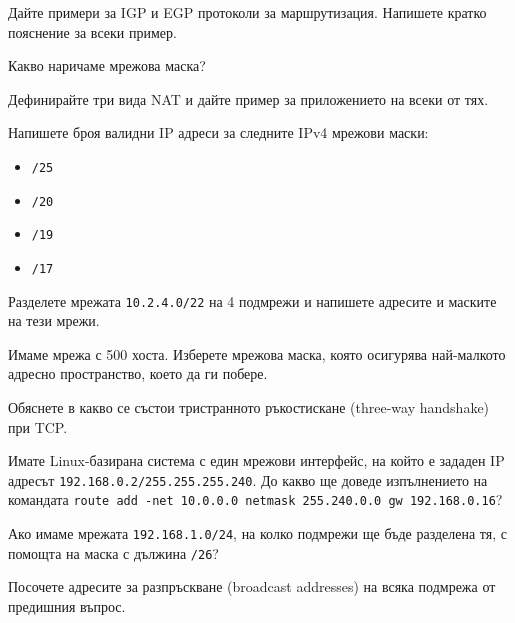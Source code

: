 \begin{questions}
\begin{center}
  \end{center}

  \question Дайте примери за IGP и EGP протоколи за маршрутизация. Напишете
  кратко пояснение за всеки пример.

  \question Какво наричаме мрежова маска?

  \question Дефинирайте три вида NAT и дайте пример за приложението на всеки от
  тях.

  \question Напишете броя валидни IP адреси за следните IPv4 мрежови маски:
  \begin{itemize}
    \item \texttt{/25}
    \item \texttt{/20}
    \item \texttt{/19}
    \item \texttt{/17}
  \end{itemize}

  \question Разделете мрежата \texttt{10.2.4.0/22} на 4 подмрежи и напишете
  адресите и маските на тези мрежи.

  \question Имаме мрежа с 500 хоста. Изберете мрежова маска, която осигурява
  най-малкото адресно пространство, което да ги побере.

  \question Обяснете в какво се състои тристранното ръкостискане
  (\foreignlanguage{english}{three-way handshake}) при TCP.

  \question Имате Linux-базирана система с един мрежови интерфейс, на който е
  зададен IP адресът \texttt{192.168.0.2/255.255.255.240}. До какво ще доведе
  изпълнението на командата \texttt{route add -net 10.0.0.0 netmask 255.240.0.0
    gw 192.168.0.16}?

  \question Ако имаме мрежата \texttt{192.168.1.0/24}, на колко подмрежи ще бъде
  разделена тя, с помощта на маска с дължина \texttt{/26}?

  \question Посочете адресите за разпръскване
  (\foreignlanguage{english}{broadcast addresses}) на всяка подмрежа от
  предишния въпрос.


\end{questions}
